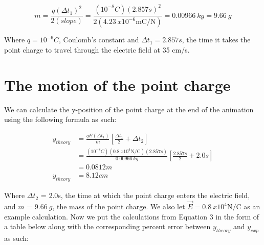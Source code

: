 \documentclass[12pt]{article}
\begin{document}
\begin{equation} \label{eq2}
    m = \frac{q(\Delta t_1)^2}{2(slope)} = \frac{(10^{-8}C)(2.857s)^2}{2(\SI{4.23}{x10^{-6}\metre\coulomb\per\newton})} = \SI{0.00966}{kg} = \SI{9.66}{g}
\end{equation}

Where $q=10^{-6}C$, Coulomb's constant and $\Delta t_1=2.857s$, the time it takes the point charge to travel through the electric field at 35 cm/s.

\section{The motion of the point charge}
We can calculate the y-position of the point charge at the end of the animation using the following formula as such:

\begin{equation} \label{eq3}
    \begin{split}
        y_{theory} & = \frac{qE(\Delta t_1)}{m}\left[\frac{\Delta t_1}{2} + \Delta t_2\right] \\
        & =\frac{(10^{-8}C)(\SI{0.8}{x10^4\newton\per\coulomb})(2.857s)}{\SI{0.00966}{kg}}\left[\frac{2.857s}{2} + 2.0s\right] \\
        & = 0.0812 m \\
        y_{theory} & = 8.12 cm
    \end{split}
\end{equation}

Where $\Delta t_2$ = 2.0s, the time at which the point charge enters the electric field, and $m$ = $\SI{9.66}{g}$, the mass of the point charge. We also let $\vec{E}=\SI{0.8}{x10^4\newton\per\coulomb}$ as an example calculation.
Now we put the calculations from Equation 3 in the form of a table below along with the corresponding percent error between $y_{theory}$ and $y_{exp}$ as such:

\setlength{\tabcolsep}{3pt}
\renewcommand{\arraystretch}{1.1}
\end{document}
